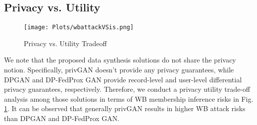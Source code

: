 \documentclass[conference]{IEEEtran}
\begin{document}





\subsection{Privacy vs. Utility}

\begin{figure}[t]
 \centering
 \texttt{[image: Plots/wbattackVSis.png]}
 \caption{Privacy vs. Utility Tradeoff}
 \label{fig:wbattackVSIS}
\end{figure}

We note that the proposed data synthesis solutions do not share the privacy notion. Specifically, privGAN doesn't provide any privacy guarantees, while DPGAN and DP-FedProx GAN provide record-level and user-level differential privacy guarantees, respectively. Therefore, we conduct a privacy utility trade-off analysis among those solutions in terms of  WB membership inference risks in Fig. \ref{fig:wbattackVSIS}.  It can be observed that generally privGAN results in higher WB attack risks than DPGAN and DP-FedProx GAN.  
\end{document}
